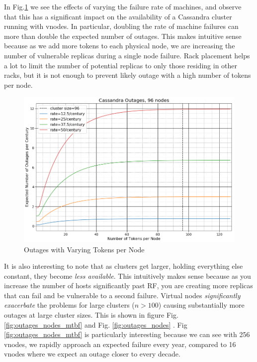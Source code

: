 \documentclass{article}
\begin{document}
In Fig.\ref{fig:outages_all_vnodes} we see the effects of varying the failure
rate of machines, and observe that this has a significant impact on the
availability of a Cassandra cluster running with vnodes. In particular,
doubling the rate of machine failures can more than double the expected
number of outages. This makes intuitive sense because as we add more tokens
to each physical node, we are increasing the number of vulnerable replicas
during a single node failure. Rack placement helps a lot to limit the number
of potential replicas to only those residing in other racks, but it is not
enough to prevent likely outage with a high number of tokens per node.

\begin{figure}[H]
    \centering
    \includegraphics[width=1.0\textwidth]{images/outages_all_vnodes.png}
    \caption{Outages with Varying Tokens per Node}
    \label{fig:outages_all_vnodes}
\end{figure}

It is also interesting to note that as clusters get larger, holding everything
else constant, they become \textit{less available}. This intuitively makes
sense because as you increase the number of hosts significantly past RF,
you are creating more replicas that can fail and be vulnerable to a second
failure. Virtual nodes \textit{significantly exacerbate} the problems for
large clusters ($n > 100$) causing substantially more outages at large cluster
sizes. This is shown in figure Fig. \ref{fig:outages_nodes_mtbf} and
Fig. \ref{fig:outages_nodes} . Fig \ref{fig:outages_nodes_mtbf} is
particularly interesting because we can see with 256 vnodes, we rapidly
approach an expected failure every year, compared to 16 vnodes where we
expect an outage closer to every decade.
\end{document}
